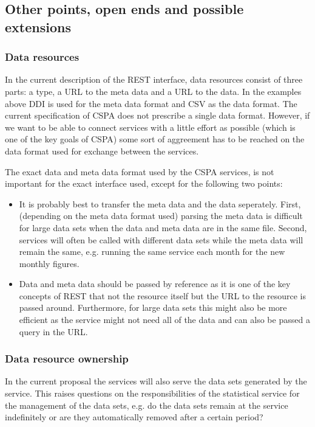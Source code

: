\documentclass[a4paper]{article}
\begin{document}
\subsection{Other points, open ends and possible extensions}

\subsubsection{Data resources}
\label{sec:dataresources}
In the current description of the REST interface, data resources consist of
three parts: a type, a URL to the meta data and a URL to the data. In the
examples above DDI is used for the meta data format and CSV as the data format.
The current specification of CSPA does not prescribe a single data format.
However, if we want to be able to connect services with a little effort as
possible (which is one of the key goals of CSPA) some sort of aggreement has to
be reached on the data format used for exchange between the services. 

The exact data and meta data format used by the CSPA services, is not important
for the exact interface used, except for the following two points:
\begin{itemize}
  \item It is probably best to transfer the meta data and the data seperately.
  First, (depending on the meta data format used) parsing the meta data is
  difficult for large data sets when the data and meta data are in the same
  file. Second, services will often be called with different data sets while the
  meta data will remain the same, e.g. running the same service each month for
  the new monthly figures. 
  \item Data and meta data should be passed by reference as it is one of the key
  concepts of REST that not the resource itself but the URL to the resource is
  passed around. Furthermore, for large data sets this might also be more
  efficient as the service might not need all of the data and can also be passed
  a query in the URL.
\end{itemize}

\subsubsection{Data resource ownership}
In the current proposal the services will also serve the data sets generated by
the service. This raises questions on the responsibilities of the statistical
service for the management of the data sets, e.g. do the data sets remain at the
service indefinitely or are they automatically removed after a certain period? 
\end{document}
